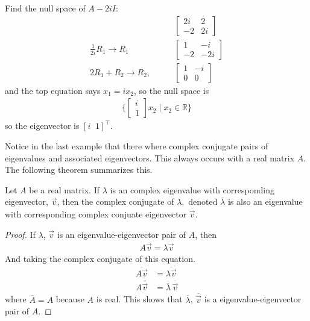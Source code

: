 \begin{example}
Find the null space of $A-2iI$: 
%
\begin{align*}
& \qquad \begin{bmatrix}
2i & 2 \\ -2 & 2i
\end{bmatrix} \\
\frac{1}{2i} R_1 \rightarrow R_1 
& \qquad \begin{bmatrix}
1 & -i \\ -2 & -2i
\end{bmatrix} \\
2R_1 + R_2 \rightarrow R_2, & \qquad
\begin{bmatrix}
1 & -i \\ 0 & 0
\end{bmatrix}
\end{align*}
and the top equation says $x_1 = ix_2$, so the null space is
%
\begin{align*}
\{ \begin{bmatrix}
i \\ 1 
\end{bmatrix}x_2 \; | \; x_2 \in \mathbb{R} \}
\end{align*}
so the eigenvector is $[i \; \; 1]^{\intercal}$. 
\end{example}

Notice in the last example that there where complex conjugate pairs of eigenvalues and associated eigenvectors.  This always occurs with a real matrix $A$.  The following theorem summarizes this. 

\begin{theorem}
Let $A$ be a real matrix.  If $\lambda$ is an complex eigenvalue with corresponding eigenvector, $\vec{v}$, then the complex conjugate of $\lambda,$ denoted $\overline{\lambda}$ is also an eigenvalue with corresponding complex conjuate eigenvector $\overline{\vec{v}}$.
\end{theorem}

\begin{proof}
If $\lambda$, $\vec{v}$ is an eigenvalue-eigenvector pair of $A$, then 
%
\begin{align*}
A\vec{v} = \lambda \vec{v}
\end{align*}
And taking the complex conjugate of this equation.  
\begin{align*}
\overline{A\vec{v}} & = \overline{\lambda \vec{v}} \\
A \overline{\vec{v}} & = \overline{\lambda} \, \overline{\vec{v}}
\end{align*}
where $\overline{A}=A$ because $A$ is real.  This shows that $\overline{\lambda}$, $\overline{\vec{v}}$ is a eigenvalue-eigenvector pair of $A$.  

\end{proof}


